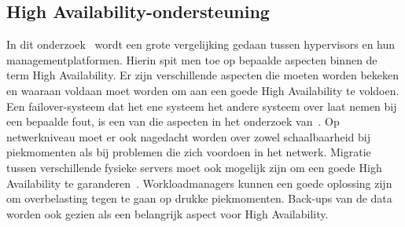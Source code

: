 \subsection{High Availability-ondersteuning}
In dit onderzoek~\autocite{dudnik2017creating} wordt een grote vergelijking gedaan tussen hypervisors en hun managementplatformen. Hierin spit men toe op bepaalde aspecten binnen de term High Availability.
Er zijn verschillende aspecten die moeten worden bekeken en waaraan voldaan moet worden om aan een goede High Availability te voldoen. Een failover-systeem dat het ene systeem het andere systeem over laat nemen bij een bepaalde fout, is een van die aspecten in het onderzoek van~\autocite{dudnik2017creating}.
Op netwerkniveau moet er ook nagedacht worden over zowel schaalbaarheid bij piekmomenten als bij problemen die zich voordoen in het netwerk. Migratie tussen verschillende fysieke servers moet ook mogelijk zijn om een goede High Availability te garanderen~\autocite{dudnik2017creating}.
Workloadmanagers kunnen een goede oplossing zijn om overbelasting tegen te gaan op drukke piekmomenten. Back-ups van de data worden ook gezien als een belangrijk aspect voor High Availability.

